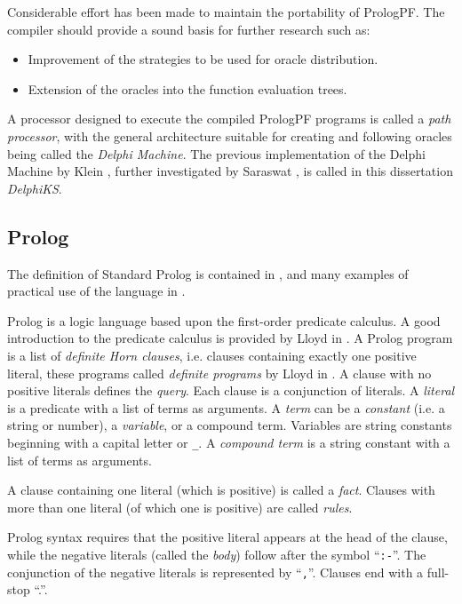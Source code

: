 Considerable effort has been made to maintain the
portability of PrologPF.  The compiler
should provide a sound basis for further research such as:
\begin{itemize}
\item{Improvement of the strategies to
  be used for oracle distribution.}
\item{Extension of the oracles into
  the function evaluation trees.}
\end{itemize}

A processor designed to execute the compiled PrologPF programs is
called a \textit{path processor}, with the general architecture suitable
for creating and following oracles being called the \textit{Delphi
Machine}.  The previous implementation of the Delphi Machine by Klein
\cite{Kle91},
further investigated by Saraswat \cite{Sar95}, is called in this dissertation
\textit{DelphiKS}.

\subsection{Prolog}

The definition of Standard Prolog is contained in \cite{DEDC96}, and many
examples of practical use of the language in \cite{CM87}.

Prolog is a logic language based upon the first-order predicate calculus.  A good
introduction to the predicate calculus is provided by Lloyd in \cite{Llo84}.
A Prolog program
is a list of \textit{definite Horn clauses}, i.e. clauses containing exactly one
positive literal, these programs called \textit{definite programs} by Lloyd in
\cite{Llo84}.  A clause with no positive literals defines the \textit{query}.
Each clause is a conjunction of literals.  A \textit{literal} is a predicate with
a list of terms as arguments.  A \textit{term} can be a \textit{constant} (i.e.
a string or number), a \textit{variable}, or a compound term. 
Variables are string constants beginning with a capital letter or \texttt{\_{}}.
A \textit{compound term}
is a string constant with a list of terms as arguments.

A clause containing one literal (which is positive) is called a \textit{fact}.  Clauses
with more than one literal (of which one is positive) are called \textit{rules}.

Prolog syntax requires that the positive literal appears at the head of the clause,
while the negative literals (called the \textit{body})
follow after the symbol ``\texttt{:-}''.  The conjunction of
the negative literals is represented by ``\texttt{,}''.
Clauses end with a full-stop ``.''.

